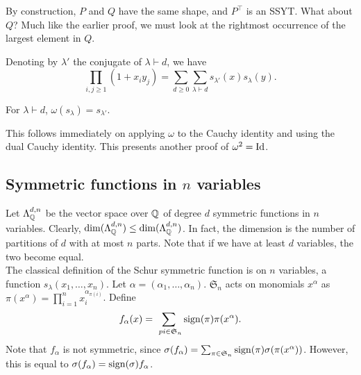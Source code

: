 	By construction, $P$ and $Q$ have the same shape, and $P^\top$ is an SSYT. What about $Q$? Much like the earlier proof, we must look at the rightmost occurrence of the largest element in $Q$.


	\begin{fcor}
		Denoting by $\lambda'$ the conjugate of $\lambda \vdash d$, we have
		\[ \prod_{i,j \ge 1} (1+x_iy_j) = \sum_{d \ge 0} \sum_{\lambda \vdash d} s_{\lambda'}(x) s_\lambda(y). \]
	\end{fcor}

	\begin{fcor}
		For $\lambda \vdash d$, $\omega(s_\lambda) = s_{\lambda'}$.
	\end{fcor}

	This follows immediately on applying $\omega$ to the Cauchy identity and using the dual Cauchy identity. This presents another proof of $\omega^2 = \operatorname{Id}$.


\subsection{Symmetric functions in $n$ variables}

	Let $\Lambda_{\mathbb{Q}}^{d,n}$ be the vector space over $\mathbb{Q}$ of degree $d$ symmetric functions in $n$ variables. Clearly, $\dim(\Lambda_{\mathbb{Q}}^{d,n}) \le \dim(\Lambda_{\mathbb{Q}}^{d,n})$. In fact, the dimension is the number of partitions of $d$ with at most $n$ parts. Note that if we have at least $d$ variables, the two become equal.\\
	The classical definition of the Schur symmetric function is on $n$ variables, a function $s_\lambda(x_1,\ldots,x_n)$. Let $\alpha = (\alpha_1,\ldots,\alpha_n)$. $\mathfrak{S}_n$ acts on monomials $x^{\alpha}$ as $\pi(x^\alpha) = \prod_{i=1}^n x_i^{\alpha_{\pi(i)}}$.
	Define
	\[ f_\alpha(x) = \sum_{\ pi \in \mathfrak{S}_n} \operatorname{sign}(\pi) \pi(x^\alpha). \]
	Note that $f_\alpha$ is not symmetric, since $\sigma(f_\alpha) = \sum_{\pi \in \mathfrak{S}_n} \operatorname{sign}(\pi) \sigma(\pi(x^\alpha))$. However, this is equal to $\sigma(f_\alpha) = \operatorname{sign}(\sigma) f_\alpha$.

